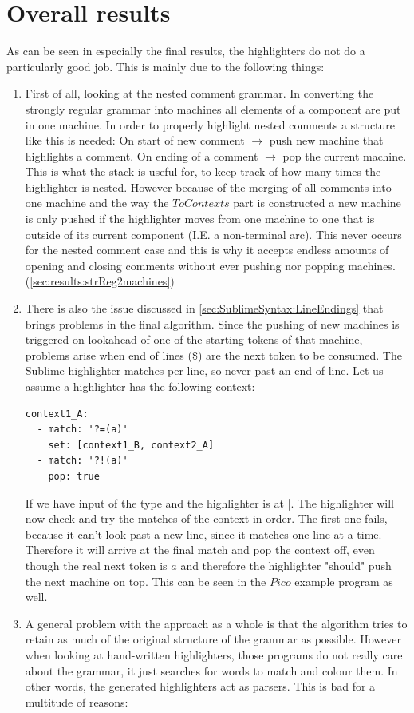 \section{Overall results}
As can be seen in especially the final results, the highlighters do not do a particularly good job. This is mainly due to the following things:
\begin{enumerate}
\item First of all, looking at the nested comment grammar. In converting the strongly regular grammar into machines all elements of a component are put in one machine. In order to properly highlight nested comments a structure like this is needed: On start of new comment $\rightarrow$ push new machine that highlights a comment. On ending of a comment $\rightarrow$ pop the current machine. This is what the stack is useful for, to keep track of how many times the highlighter is nested. However because of the merging of all comments into one machine and the way the $ToContexts$ part is constructed a new machine is only pushed if the highlighter moves from one machine to one that is outside of its current component (I.E. a non-terminal arc). This never occurs for the nested comment case and this is why it accepts endless amounts of opening and closing comments without ever pushing nor popping machines. (\ref{sec:results:strReg2machines})
\pagebreak\item There is also the issue discussed in \ref{sec:SublimeSyntax:LineEndings} that brings problems in the final algorithm. Since the pushing of new machines is triggered on lookahead of one of the starting tokens of that machine, problems arise when end of lines (\$) are the next token to be consumed. The Sublime highlighter matches per-line, so never past an end of line. Let us assume a highlighter has the following context:
\begin{lstlisting}[language=SublimeSyntax]
context1_A:
  - match: '?=(a)'
    set: [context1_B, context2_A]
  - match: '?!(a)'
    pop: true
\end{lstlisting}
If we have input of the type  and the highlighter is at |. The highlighter will now check and try the matches of the context in order. The first one fails, because it can't look past a new-line, since it matches one line at a time. Therefore it will arrive at the final match and pop the context off, even though the real next token is $a$ and therefore the highlighter "should" push the next machine on top. This can be seen in the $Pico$ example program as well.
\item A general problem with the approach as a whole is that the algorithm tries to retain as much of the original structure of the grammar as possible. However when looking at hand-written highlighters, those programs do not really care about the grammar, it just searches for words to match and colour them. In other words, the generated highlighters act as parsers. This is bad for a multitude of reasons:

\end{enumerate}
